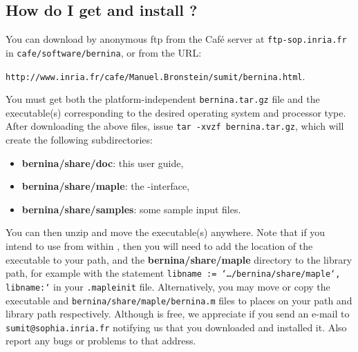 \subsection{How do I get and install \bernina?}
You can download \bernina{} by anonymous ftp from the {\sc Caf\'e} server at
{\tt ftp-sop.inria.fr} in {\tt cafe/software/bernina},
or from the URL:\\
\vspace{-2mm}
\begin{center}
{\tt http://www.inria.fr/cafe/Manuel.Bronstein/sumit/bernina.html}.
\end{center}
You must get both the platform-independent {\tt bernina.tar.gz} file
and the executable(s) corresponding to the desired operating system and
processor type.
After downloading the above files, issue
{\tt tar -xvzf bernina.tar.gz},
which will create the following subdirectories:
\begin{itemize}
\item{\bf bernina/share/doc}: this user guide,
\item{\bf bernina/share/maple}: the \bernina-\maple interface,
\item{\bf bernina/share/samples}: some sample \bernina{} input files.
\end{itemize}
You can then unzip and move the executable(s) anywhere. Note that
if you intend to use \bernina{} from within \maple, then you will need
to add the location of the \bernina{} executable to your path,
and the {\bf bernina/share/maple} directory to the \maple{} library path,
for example with the statement
{\tt libname := `\dots/bernina/share/maple`, libname:`} in your
{\tt .mapleinit} file. Alternatively,
you may move or copy the executable and {\tt bernina/share/maple/bernina.m}
files to places on your path and \maple{} library path respectively.
Although \bernina{} is free, we appreciate if you send an e-mail to
{\tt sumit@sophia.inria.fr} notifying us that you downloaded and
installed it. Also report any bugs or problems to that address.
